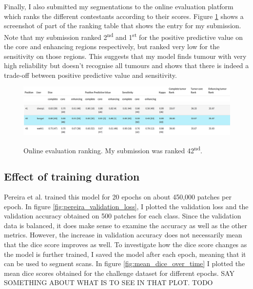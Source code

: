 \documentclass[12pt,a4paper,twoside,openright]{report}
\begin{document}
Finally, I also submitted my segmentations to the online evaluation platform which ranks the different contestants according to their scores. Figure \ref{fig:online_eval_rank} shows a screenshot of part of the ranking table that shows the entry for my submission. Note that my submission ranked 2\textsuperscript{nd} and 1\textsuperscript{st} for the positive predictive value on the core and enhancing regions respectively, but ranked very low for the sensitivity on those regions. This suggests that my model finds tumour with very high reliability but doesn't recognise all tumours and shows that there is indeed a trade-off between positive predictive value and sensitivity.

\begin{figure}
	\centering
	\label{fig:online_eval_rank}
	\includegraphics[width=\textwidth]{ranking_table_header}
	\includegraphics[width=\textwidth]{pereira_model_ranked_results}
	\caption{Online evaluation ranking. My submission was ranked 42\textsuperscript{nd}.}
\end{figure}

\subsection{Effect of training duration}
Pereira et al. trained this model for 20 epochs on about 450,000 patches per epoch. In figure \ref{fig:pereira_validation_loss}, I plotted the validation loss and the validation accuracy obtained on 500 patches for each class. Since the validation data is balanced, it does make sense to examine the accuracy as well as the other metrics. However, the increase in validation accuracy does not necessarily mean that the dice score improves as well. To investigate how the dice score changes as the model is further trained, I saved the model after each epoch, meaning that it can be used to segment scans. In figure \ref{fig:mean_dice_over_time} I plotted the mean dice scores obtained for the challenge dataset for different epochs. SAY SOMETHING ABOUT WHAT IS TO SEE IN THAT PLOT. TODO
\end{document}
